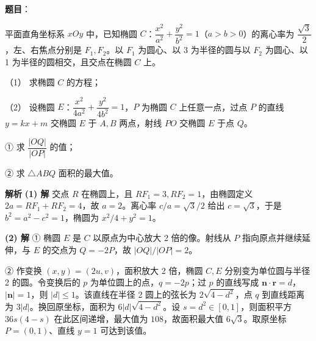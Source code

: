 \begin{answer}

\textbf{题目}：

平面直角坐标系 $xOy$ 中，已知椭圆 $C$：$\dfrac{x^2}{a^2}+\dfrac{y^2}{b^2}=1$（$a>b>0$）的离心率为 $\dfrac{\sqrt{3}}{2}$，左、右焦点分别是 $F_1,F_2$。以 $F_1$ 为圆心、以 3 为半径的圆与以 $F_2$ 为圆心、以 1 为半径的圆相交，且交点在椭圆 $C$ 上。

（1） 求椭圆 $C$ 的方程；

（2） 设椭圆 $E$：$\dfrac{x^2}{4a^2}+\dfrac{y^2}{4b^2}=1$，$P$ 为椭圆 $C$ 上任意一点，过点 $P$ 的直线 $y=kx+m$ 交椭圆 $E$ 于 $A,B$ 两点，射线 $PO$ 交椭圆 $E$ 于点 $Q$。

① 求 $\dfrac{|OQ|}{|OP|}$ 的值；

② 求 $\triangle ABQ$ 面积的最大值。

\textbf{解析}
\textbf{(1) 解}
交点 $R$ 在椭圆上，且 $RF_1=3,RF_2=1$，由椭圆定义 $2a=RF_1+RF_2=4$，故 $a=2$。离心率 $c/a=\sqrt3/2$ 给出 $c=\sqrt3$，于是 $b^2=a^2-c^2=1$，椭圆为 $x^2/4+y^2=1$。

\textbf{(2) 解}
① 椭圆 $E$ 是 $C$ 以原点为中心放大 2 倍的像。射线从 $P$ 指向原点并继续延伸，与 $E$ 的交点为 $Q=-2P$，故 $|OQ|/|OP|=2$。

② 作变换 $(x,y)=(2u,v)$，面积放大 2 倍，椭圆 $C,E$ 分别变为单位圆与半径 2 的圆。令变换后的 $p$ 为单位圆上的点，$q=-2p$；过 $p$ 的直线写成 $\mathbf n\cdot\mathbf r=d$，$|\mathbf n|=1$，则 $|d|\le1$。该直线在半径 2 圆上的弦长为 $2\sqrt{4-d^2}$，点 $q$ 到直线距离为 $3|d|$。换回原坐标，面积为 $6|d|\sqrt{4-d^2}$。设 $s=d^2\in[0,1]$，则面积平方 $36s(4-s)$ 在此区间递增，最大值为 $108$，故面积最大值 $6\sqrt3$。取原坐标 $P=(0,1)$、直线 $y=1$ 可达到该值。



\end{answer}

